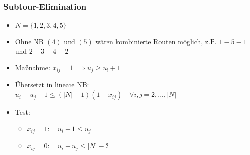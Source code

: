 \documentclass{beamer}
\begin{document}
\begin{frame}
  \frametitle{Subtour-Elimination}
  \begin{itemize}
    \item $N = \{1, 2, 3, 4, 5\}$
    \item Ohne NB $(4)$ und $(5)$ wären kombinierte Routen möglich, z.B.\newline
    $1-5-1$ und $2-3-4-2$
    \item Maßnahme: $x_{ij} = 1 \implies u_j \geq u_i + 1$
    \item Übersetzt in lineare NB: $u_i - u_j + 1 \leq (|N| - 1)(1 - x_{ij}) \quad \forall i, j = 2, ..., |N|$
    \item Test:
    \begin{itemize}
      \item $x_{ij} = 1: \quad u_i + 1 \leq u_j$ \checkmark
      \item $x_{ij} = 0: \quad u_i - u_j \leq |N| - 2$ \checkmark
    \end{itemize}
  \end{itemize}
\end{frame}
\end{document}

